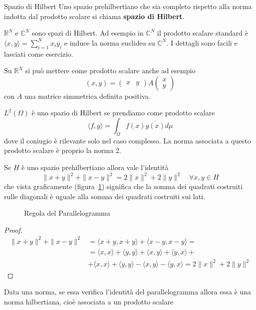 \begin{definition}{Spazio di Hilbert}
    Uno spazio prehilbertiano che sia completo rispetto alla norma indotta dal
    prodotto scalare si chiama \textbf{spazio di Hilbert}.
\end{definition}
\begin{example}
    \(\mathbb{R}^{N}\) e \(\mathbb{C}^{N}\) sono spazi di Hilbert. Ad esempio in
    \(\mathbb{C}^{N}\) il prodotto scalare standard è \(\langle x, y \rangle =
    \sum_{i=1}^{N} x_{i} \overline{y_{i}}\) e induce la norma euclidea su
    \(\mathbb{C}^{N}\). I dettagli sono facili e lasciati come esercizio.

    Su \(\mathbb{R}^{N}\) si può mettere come prodotto scalare anche ad esempio
    \[
        {(x, y)} = \begin{pmatrix}
            x & y
        \end{pmatrix} A \begin{pmatrix}
            x \\ y
        \end{pmatrix}
    \]
    con \(A\) una matrice simmetrica definita positiva.
\end{example}
\begin{example}
    \(L^{2}{(\Omega)}\) è uno spazio di Hilbert se prendiamo come prodotto
    scalare 
    \[
        \langle f, g \rangle = \int_{\Omega} f(x) \overline{g(x)} d\mu
    \]
    dove il coniugio è rilevante solo nel caso complesso. La norma associata a
    questo prodotto scalare è proprio la norma 2.
\end{example}
\begin{proposition}
    Se \(H\) è uno spazio prehilbertiano allora vale l'identità
    \[
        \|x + y\|^2 + \|x - y\|^2 = 2\|x\|^2 + 2\|y\|^2 \quad \forall x, y \in H
    \]
    che vista graficamente (figura~\ref{fig:parallelogramma}) significa che la somma dei quadrati costruiti
    sulle diagonali è uguale alla somma dei quadrati costruiti sui lati.
\end{proposition}
\begin{figure}[ht]
    \centering
    \caption{Regola del Parallelogramma}\label{fig:parallelogramma}
\end{figure}
\begin{proof}
    \begin{align*}
        \|x+y\|^2 + \|x-y\|^2 &= \langle x+y, x+y \rangle + \langle x-y, x-y
        \rangle = \\ &= \langle x, x \rangle + \langle y, y \rangle + \langle x, y
        \rangle + \langle y, x \rangle + \\ &+ \langle x, x \rangle + \langle y, y
        \rangle - \langle x, y \rangle - \langle y, x \rangle = 2\|x\|^2 +
        2\|y\|^2
    \end{align*}
\end{proof}
    Data una norma, se essa verifica l'identità del parallelogramma allora
    essa è una norma hilbertiana, cioè associata a un prodotto scalare

